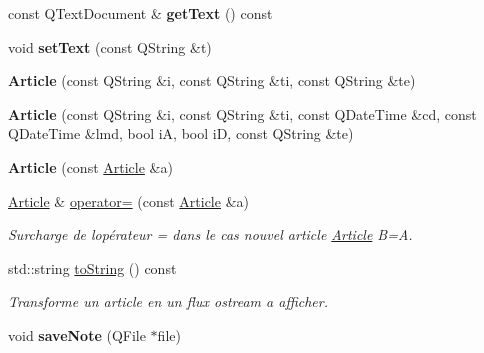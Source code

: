 \begin{DoxyCompactItemize}
\item 
\mbox{\label{class_article_a6620c09453a87251bf312d1c7b9e4112}} 
const Q\+Text\+Document \& {\bfseries get\+Text} () const
\item 
\mbox{\label{class_article_a7144942027b1761cfcbd21761dd5cee8}} 
void {\bfseries set\+Text} (const Q\+String \&t)
\item 
\mbox{\label{class_article_af3f6b98ba3cc46aaa5625a17266eb67f}} 
{\bfseries Article} (const Q\+String \&i, const Q\+String \&ti, const Q\+String \&te)
\item 
\mbox{\label{class_article_a067e635213e9ff6b93fd8f88e471652f}} 
{\bfseries Article} (const Q\+String \&i, const Q\+String \&ti, const Q\+Date\+Time \&cd, const Q\+Date\+Time \&lmd, bool iA, bool iD, const Q\+String \&te)
\item 
\mbox{\label{class_article_a77eaa1a87e24eec7788f438a30ff162f}} 
{\bfseries Article} (const \hyperlink{class_article}{Article} \&a)
\item 
\mbox{\label{class_article_ae4059abc035598ff3faf554fd74a1492}} 
\hyperlink{class_article}{Article} \& \hyperlink{class_article_ae4059abc035598ff3faf554fd74a1492}{operator=} (const \hyperlink{class_article}{Article} \&a)
\begin{DoxyCompactList}\small\item\em Surcharge de l\textquotesingle{}opérateur = dans le cas nouvel article \hyperlink{class_article}{Article} B=A. \end{DoxyCompactList}\item 
std\+::string \hyperlink{class_article_ae40d268ecffbaaa549968a81ea609ba4}{to\+String} () const
\begin{DoxyCompactList}\small\item\em Transforme un article en un flux ostream a afficher. \end{DoxyCompactList}\item 
\mbox{\label{class_article_a83c6688e4886b871938b9dca34e78041}} 
void {\bfseries save\+Note} (Q\+File $\ast$file)
\end{DoxyCompactItemize}
